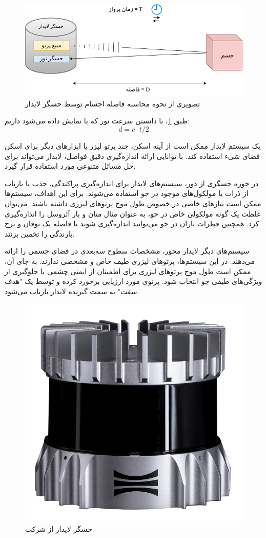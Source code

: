 \begin{figure}[h]
	\centering
	\includegraphics[scale=0.5]{figures/LiDAR_TOF.png}
	\caption{تصویری از نحوه محاسبه فاصله اجسام توسط حسگر لایدار}
	\label{fig:LiDAR_TOF}
\end{figure}

طبق \cref{fig:LiDAR_TOF}، با دانستن سرعت نور که با  نمایش داده می‌شود داریم:
\begin{equation}\label{d=ct/2}
d = c \cdot t / 2
\end{equation}

یک سیستم لایدار ممکن است از آینه اسکن، چند پرتو لیزر یا ابزارهای دیگر برای اسکن فضای شیء استفاده کند. با توانایی ارائه اندازه‌گیری دقیق فواصل، لایدار می‌تواند برای حل مسائل متنوعی مورد استفاده قرار گیرد.

در حوزه حسگری از دور، سیستم‌های لایدار برای اندازه‌گیری پراکندگی، جذب یا بازتاب از ذرات یا مولکول‌های موجود در جو استفاده می‌شوند. برای این اهداف، سیستم‌ها ممکن است نیازهای خاصی در خصوص طول موج پرتوهای لیزری داشته باشند. می‌توان غلظت یک گونه مولکولی خاص در جو، به عنوان مثال متان و بار آئروسل را اندازه‌گیری کرد. همچنین قطرات باران در جو می‌توانند اندازه‌گیری شوند تا فاصله یک توفان و نرخ بارندگی را تخمین بزنند.

سیستم‌های دیگر لایدار محور، مشخصات سطوح سه‌بعدی در فضای جسمی را ارائه می‌دهند. در این سیستم‌ها، پرتوهای لیزری طیف خاص و مشخصی ندارند. به جای آن، ممکن است طول موج پرتوهای لیزری برای اطمینان از ایمنی چشمی یا جلوگیری از ویژگی‌های طیفی جو انتخاب شود. پرتوی مورد ارزیابی برخورد کرده و توسط یک "هدف سفت" به سمت گیرنده لایدار بازتاب می‌شود.

\begin{figure}[h]
    \centering
    \includegraphics[width=0.25\linewidth]{figures/OS1_64_LiDAR.png}
    \caption{حسگر لایدار  از شرکت  \cite{Ouster:LiDAR_Specification}}
    \label{fig:OS1_64_LiDAR}
\end{figure}

